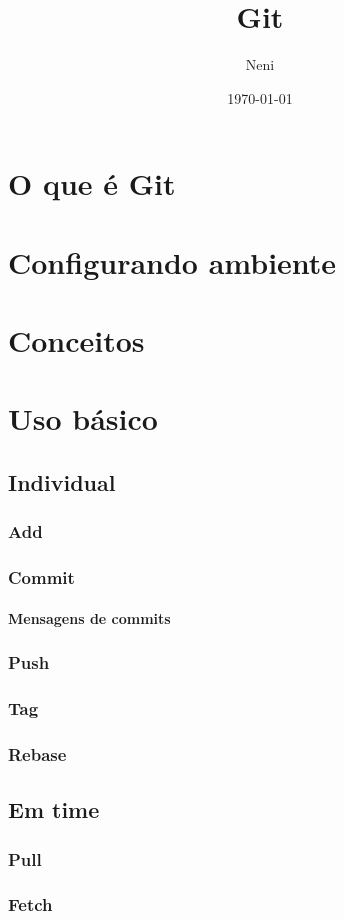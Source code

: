 \documentclass{apostila}
\title{Git}
\author{Neni}
\date{\today}
\begin{document}
\chapter{O que é Git}


\chapter{Configurando ambiente}


\chapter{Conceitos}


\chapter{Uso básico}

\section{Individual}
\subsection{Add}
\subsection{Commit}
\subsubsection{Mensagens de commits}
\subsection{Push}
\subsection{Tag}
\subsection{Rebase}

\section{Em time}
\subsection{Pull}
\subsection{Fetch}
\end{document}
